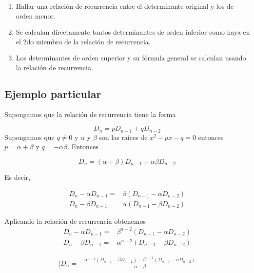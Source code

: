 \documentclass[
]{article}
\providecommand{\tightlist}{%
  \setlength{\itemsep}{0pt}\setlength{\parskip}{0pt}}
\begin{document}
\begin{enumerate}
\def\labelenumi{\arabic{enumi})}
\tightlist
\item
  Hallar una relación de recurrencia entre el determinante original y
  los de orden menor.
\item
  Se calculan directamente tantos determinantes de orden inferior como
  haya en el 2do miembro de la relación de recurrencia.
\item
  Los determinantes de orden superior y su fórmula general se calculan
  usando la relación de recurrencia.
\end{enumerate}

\hypertarget{ejemplo-particular}{%
\subsection{Ejemplo particular}\label{ejemplo-particular}}

Supongamos que la relación de recurrencia tiene la forma

\begin{equation*}
  D_{n} = p D_{n-1} + q D_{n-2}
\end{equation*} Supongamos que \(q\ne 0\) y \(\alpha\) y \(\beta\) son
las raíces de \(x^2-px-q=0\) entonces \(p = \alpha + \beta\) y
\(q=-\alpha\beta\). Entonces

\begin{equation*}
D_{n} = (\alpha + \beta)D_{n-1} - \alpha\beta D_{n-2} 
\end{equation*}

Es decir,

\begin{equation*}
\begin{array}{cc}
D_{n} - \alpha D_{n-1}= & \beta (D_{n-1} - \alpha D_{n-2}) \\
D_{n} - \beta D_{n-1}=  & \alpha (D_{n-1} - \beta D_{n-2}) 
\end{array}
\end{equation*}

Aplicando la relación de recurrencia obtenemos \begin{equation*}
\begin{array}{cc}
D_{n} - \alpha D_{n-1}= & \beta^{n-2}  (D_{n-1} - \alpha D_{n-2}) \\
D_{n} - \beta D_{n-1}=  & \alpha^{n-2} (D_{n-1} - \beta D_{n-2}) 
\end{array}
\end{equation*}

\begin{equation*}
\begin{array}{cc}   |
D_{n} = & \frac{\alpha^{n-1}  (D_{n-1} - \beta D_{n-2}) - \beta^{n-1} (D_{n-1} - \alpha D_{n-2})}{\alpha-\beta}  
\end{array}
\end{equation*}
\end{document}
